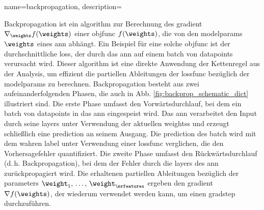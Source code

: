 {{{{
{name={backpropagation},
	description={Backpropagation ist ein \gls{algorithm} zur Berechnung des \gls{gradient} 
	 	$\nabla_{\weights} f(\weights)$ einer \gls{objfunc} $f(\weights)$, die von den 
	  	\glspl{modelparam} $\weights$ eines \gls{ann} abhängt. Ein Beispiel für eine solche \gls{objfunc} 
	  	ist der durchschnittliche \gls{loss}, der durch das \gls{ann} auf einem \gls{batch} von \glspl{datapoint} verursacht wird. 
	  	Dieser \gls{algorithm} ist eine direkte Anwendung der Kettenregel aus der Analysis, um effizient die partiellen Ableitungen 
		der \gls{lossfunc} bezüglich der \glspl{modelparam} zu berechnen.
		Backpropagation besteht aus zwei aufeinanderfolgenden Phasen, die auch in Abb. \ref{fig:backprop_schematic_dict} illustriert sind. 
		Die erste Phase umfasst den Vorwärtsdurchlauf, bei dem ein \gls{batch} von \glspl{datapoint} in das \gls{ann} eingespeist wird. 
		Das \gls{ann} verarbeitet den Input durch seine \glspl{layer} unter Verwendung der aktuellen \glspl{weights} und erzeugt schließlich 
		eine \gls{prediction} an seinem Ausgang. Die \gls{prediction} des \gls{batch} wird mit dem wahren \gls{label} unter Verwendung 
		einer \gls{lossfunc} verglichen, die den Vorhersagefehler quantifiziert. Die zweite Phase umfasst den 
		Rückwärtsdurchlauf (d. h. Backpropagation), bei dem der Fehler durch die \glspl{layer} des \gls{ann} zurückpropagiert wird. 
	   	Die erhaltenen partiellen Ableitungen bezüglich der \glspl{parameter} $\weight_{1},\,\ldots,\,\weight_{\nrfeatures}$ ergeben 
		den \gls{gradient} $\nabla f(\weights)$, der wiederum verwendet werden kann, um einen \gls{gradstep} durchzuführen.
	   	\begin{figure}[H]
		\centering
\end{figure}}}}}}}
